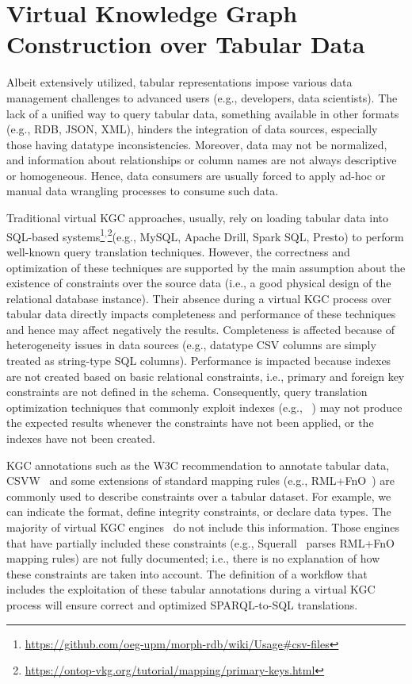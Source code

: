 \section{Virtual Knowledge Graph Construction over Tabular Data}
\label{chap6_morphgcsv}
Albeit extensively utilized, tabular representations impose various data management challenges to advanced users (e.g., developers, data scientists). The lack of a unified way to query tabular data, something available in other formats (e.g., RDB, JSON, XML), hinders the integration of data sources, especially those having datatype inconsistencies. Moreover, data may not be normalized, and information about relationships or column names are not always descriptive or homogeneous. Hence, data consumers are usually forced to apply ad-hoc or manual data wrangling processes to consume such data. 

Traditional virtual KGC approaches, usually, rely on loading tabular data into SQL-based systems\footnote{\url{https://github.com/oeg-upm/morph-rdb/wiki/Usage\#csv-files}}$^,$\footnote{\url{https://ontop-vkg.org/tutorial/mapping/primary-keys.html}}(e.g., MySQL, Apache Drill, Spark SQL, Presto) to perform well-known query translation techniques. However, the correctness and optimization of these techniques are supported by the main assumption about the existence of constraints over the source data (i.e., a good physical design of the relational database instance). Their absence during a virtual KGC process over tabular data directly impacts completeness and performance of these techniques and hence may affect negatively the results. Completeness is affected because of heterogeneity issues in data sources (e.g., datatype CSV columns are simply treated as string-type SQL columns). Performance is impacted because indexes are not created based on basic relational constraints, i.e., primary and foreign key constraints are not defined in the schema. Consequently, query translation optimization techniques that commonly exploit indexes (e.g., ~\citep{rodriguez2015efficient,priyatna2014formalisation}) may not produce the expected results whenever the constraints have not been applied, or the indexes have not been created.

KGC annotations such as the W3C recommendation to annotate tabular data, CSVW~\citep{tennison2015model} and some extensions of standard mapping rules (e.g., RML+FnO~\citep{de2017declarative}) are commonly used to describe constraints over a tabular dataset. For example, we can indicate the format, define integrity constraints, or declare data types. The majority of virtual KGC engines~\citep{priyatna2014formalisation,endris2019ontario} do not include this information. Those engines that have partially included these constraints (e.g., Squerall~\citep{mami2019squerall} parses RML+FnO mapping rules) are not fully documented; i.e., there is no explanation of how these constraints are taken into account. The definition of a workflow that includes the exploitation of these tabular annotations during a virtual KGC process will ensure correct and optimized SPARQL-to-SQL translations.

